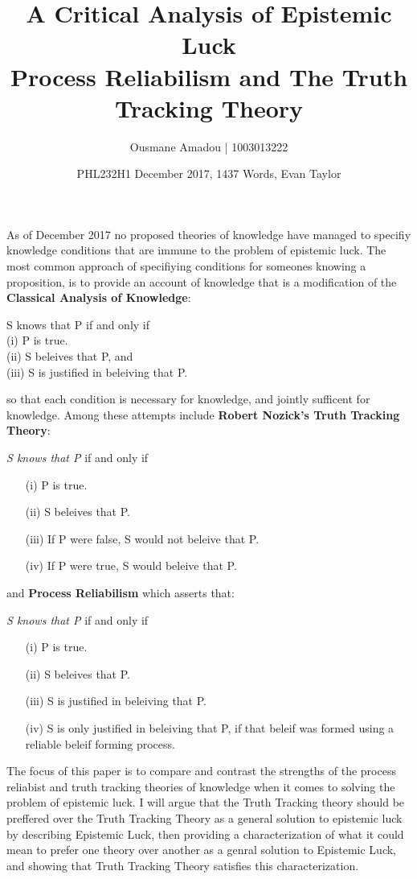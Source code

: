 \documentclass{article}
\title{%
  A Critical Analysis of Epistemic Luck \\
  \large Process Reliabilism and The Truth Tracking Theory }
\author{Ousmane Amadou | 1003013222}
\date{PHL232H1 December 2017, 1437 Words, Evan Taylor}
\begin{document}
\maketitle

As of December 2017 no proposed theories of knowledge have managed
to specifiy knowledge conditions that are immune to the problem of
epistemic luck. %
The most common approach of specifiying conditions for someones knowing
a proposition, is to provide an account of knowledge that is a modification
of the \textbf{Classical Analysis of Knowledge}:
\begin{displayquote} %
   S knows that P if and only if \\
  (i) P is true. \\
  (ii) S beleives that P, and \\
  (iii) S is justified in beleiving that P.
\end{displayquote} so that each condition is necessary for knowledge, and jointly
sufficent for knowledge. Among these attempts include \textbf{Robert Nozick's Truth Tracking Theory}:
\begin{displayquote}
  \textit{S knows that P} if and only if
  \begin{enumerate}
      \item[(i)] P is true.
      \item[(ii)] S beleives that P.
      \item[(iii)] If P were false, S would not beleive that P.
      \item[(iv)] If P were true, S would beleive that P.
  \end{enumerate}
\end{displayquote}
and  \textbf{Process Reliabilism} which asserts that:
\begin{displayquote}
  \textit{S knows that P} if and only if
  \begin{enumerate}
      \item[(i)] P is true.
      \item[(ii)] S beleives that P.
      \item[(iii)] S is justified in beleiving that P.
      \item[(iv)] S is only justified in beleiving that P, if that beleif
      was formed using a reliable beleif forming process.
  \end{enumerate}
\end{displayquote}
The focus of this paper is to compare and contrast the strengths of the process
reliabist and truth tracking theories of knowledge when it comes to solving the
problem of epistemic luck. I will argue that the Truth Tracking theory should be
preffered over the Truth Tracking Theory as a general solution to epistemic luck by
describing Epistemic Luck, then providing a characterization of what it could
mean to prefer one theory over another as a genral solution to Epistemic Luck, and
showing that Truth Tracking Theory satisfies this characterization.
\end{document}
